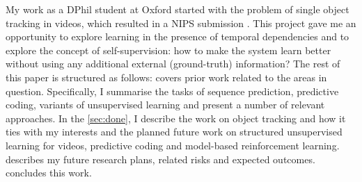     My work as a DPhil student at Oxford started with the problem of single object tracking in videos, which resulted in a NIPS submission \citep{Kosiorek2017}.    
    This project gave me an opportunity to explore learning in the presence of temporal dependencies and to explore the concept of self-supervision: how to make the system learn better without using any additional external (\eg ground-truth) information? 
    The rest of this paper is structured as follows:
     covers prior work related to the areas in question.
    Specifically, I summarise the tasks of sequence prediction, predictive coding, variants of unsupervised learning and present a number of relevant approaches.
    In the \cref{sec:done}, I describe the work on object tracking and how it ties with my interests and the planned future work on structured unsupervised learning for videos, predictive coding and model-based reinforcement learning.
     describes my future research plans, related risks and expected outcomes.
     concludes this work. 